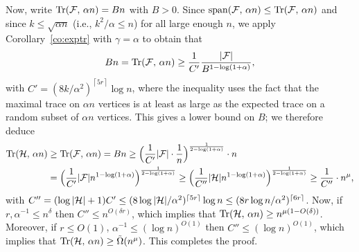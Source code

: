 \documentclass[11pt]{article}
\makeatletter
\renewenvironment{proof}[1][\proofname]
{\par\pushQED{\qed}
	\normalfont\topsep6\p@\@plus6\p@\relax\trivlist
	\item[\hskip\labelsep\bfseries#1\@addpunct{.}]
	\ignorespaces}
{\popQED\endtrivlist\@endpefalse}
\newcommand{\FF}{{\cal F}}
\newcommand{\ceil}[1]{\left\lceil #1 \right\rceil}
\renewcommand{\wp}{\mathrm{span}}
\renewcommand{\a}{\alpha}
\renewcommand{\d}{\delta}
\newcommand{\g}{\gamma}
\newcommand{\sub}{\subseteq}
\newcommand{\HH}{{\cal H}}
\newcommand{\C}{\mu}
\DeclareMathOperator{\trace}{Tr}
\makeatother
\begin{document}
\begin{proof}
	Now, write $\trace(\FF,\,\a n) =B n$ with $B > 0$.
	Since $\wp(\FF,\,\a n) \le \trace(\FF,\,\a n)$ and since $k \le \sqrt{\a n}$ (i.e., $k^2/\a \le n$) for all large enough $n$, we apply Corollary~\ref{co:exptr} with $\g=\a$ to obtain that
	$$B n = \trace(\FF,\,\a n) 
	\ge \frac{1}{C'}\frac{|\FF|}{B^{1-\log(1+\a)}},$$
	with $C' =  (8k/\a^2)^{\ceil{5r}}\log n$, where the inequality uses the fact that the maximal trace on $\alpha n$ vertices is at least as large as the expected trace on a random subset 
	of $\a n$ vertices. 
	This gives a lower bound on $B$; we therefore deduce
	\begin{align*}
	\trace(\HH,\,\a n) &\ge \trace(\FF,\,\a n) = B n 
	\ge \Big(\frac{1}{C'}|\FF|\cdot \frac{1}{n}\Big)^{\frac{1}{2-\log(1+\a)}} \cdot n\\
	&= \Big(\frac{1}{C'}|\FF| n^{1-\log(1+\a)}\Big)^{\frac{1}{2-\log(1+\a)}}
	\ge \Big(\frac{1}{C''}|\HH|n^{1-\log(1+\a)}\Big)^{\frac{1}{2-\log(1+\a)}} 
	\ge \frac{1}{C''} \cdot n^{\C},
	\end{align*}
	with $C''=(\log|\HH|+1)C' \le (8\log|\HH|/\a^2)^{\ceil{5r}}\log n \le (8r\log n/\a^2)^{\ceil{6r}}$. 
	Now, if $r,\a^{-1} \le n^{\d}$ then $C'' \le n^{O(\d r)}$, which implies that $\trace(\HH,\,\a n) \ge n^{\C(1-O(\d))}$.
	Moreover, if $r \le O(1)$, $\a^{-1} \le (\log n)^{O(1)}$ then $C'' \le (\log n)^{O(1)}$, which implies that 
	$\trace(\HH,\,\a n) \ge \tilde\Omega(n^{\C})$.
	This completes the proof.
\end{proof}
\end{document}
